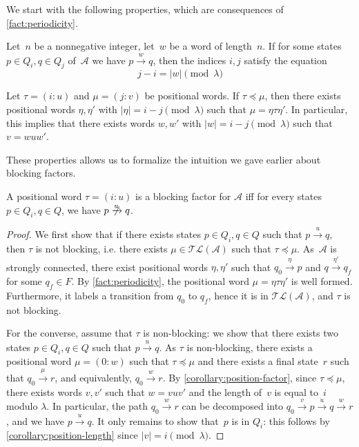 \documentclass[letterpaper, USenglish, cleveref, autoref, thm-restate, numberwithinsect]{lipics-v2021}
\theoremstyle{theorem}
\theoremstyle{definition}
\newcommand{\Aa}{\mathcal{A}}
\newcommand{\factor}{\preccurlyeq}
\newcommand{\timedlang}[1]{\mathcal{TL}( #1 )}
\newcommand{\timedword}[2]{(#1:#2)}
\begin{document}
We start with the following properties, which are consequences of \cref{fact:periodicity}.
\begin{corollary}\label{corollary:position-length}
    Let~$n$ be a nonnegative integer, let~$w$ be a word of length~$n$.
    If for some states $p\in Q_i, q\in Q_j$ of~$\Aa$ we have $p\xrightarrow{w}q$,
    then the indices $i,j$ satisfy the equation
    \begin{equation*}
        j-i = |w| \pmod{\lambda}
    \end{equation*}
\end{corollary}
\begin{corollary}\label{corollary:position-factor}
    Let $\tau = \timedword{i}{u}$ and $\mu = \timedword{j}{v}$ be positional words.
    If $\tau \factor \mu$, then there exists positional words $\eta, \eta'$ with $|\eta| = i-j \pmod{\lambda}$
    such that $\mu = \eta\tau\eta'$.
    In particular, this implies that there exists words $w,w'$ with $|w| = i-j \pmod{\lambda}$
    such that $v = wuw'$.
\end{corollary}

These properties allows us to formalize the intuition we gave earlier about blocking factors.

\begin{lemma}\label{lemma:intuition-timed-word}
    A positional word $\tau = \timedword{i}{u}$ is a blocking factor for $\Aa$
    iff for every states $p\in Q_i, q\in Q$, we have $p\centernot{\xrightarrow{u}}q$.
\end{lemma}

\begin{proof}
    We first show that if there exists states $p\in Q_i, q\in Q$ such that $p\xrightarrow{u}q$,
    then $\tau$ is not blocking, i.e. there exists $\mu\in \timedlang{\Aa}$ such that $\tau\factor\mu$.
    As~$\Aa$ is strongly connected, there exist positional words $\eta,\eta'$ such that $q_0 \xrightarrow{\eta} p$
    and $q\xrightarrow{\eta'} q_f$ for some $q_f\in F$.
    By \cref{fact:periodicity}, the positional word $\mu = \eta\tau \eta'$ is well formed.
    Furthermore, it labels a transition from $q_0$ to $q_f$, hence it is in $\timedlang{\Aa}$, and $\tau$ is not blocking.
    
    For the converse, assume that $\tau$ is non-blocking: we show that there exists two states $p\in Q_i, q\in Q$ such that $p\xrightarrow{u}q$.
    As $\tau$ is non-blocking, there exists a positional word $\mu = \timedword{0}{w}$ such that $\tau\factor \mu$
    and there exists a final state~$r$ such that $q_0\xrightarrow{\mu}r$, and equivalently, $q_0\xrightarrow{w}r$.
    By \cref{corollary:position-factor}, since $\tau\factor \mu$, there exists words $v,v'$ such that $w = vuv'$ and the length of~$v$ is equal to~$i$ modulo $\lambda$.
    In particular, the path $q_0\xrightarrow{w}r$ can be decomposed into $q_0\xrightarrow{v}p\xrightarrow{u}q\xrightarrow{w}r$, and we have $p\xrightarrow{u}q$.
    It only remains to show that~$p$ is in $Q_i$: this follows by \cref{corollary:position-length} since $|v| = i\pmod{\lambda}$.
\end{proof}
\end{document}
